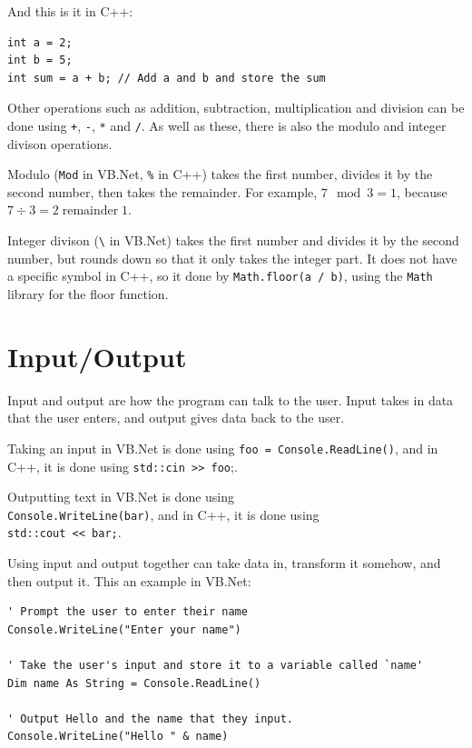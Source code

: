     And this is it in C++:
    
    \begin{verbatim}
int a = 2;
int b = 5;
int sum = a + b; // Add a and b and store the sum
    \end{verbatim}

    Other operations such as addition, subtraction, multiplication and division can be done using \verb|+|, \verb|-|, \verb|*| and \verb|/|.
    As well as these, there is also the modulo and integer divison operations.

    Modulo (\verb|Mod| in VB.Net, \verb|%| in C++) takes the first number, divides it by the second number, then takes the remainder.
    For example, $7\mod 3=1$, because $7\div3=2\;\text{remainder}\;1$.

    Integer divison (\verb|\| in VB.Net) takes the first number and divides it by the second number, but rounds down so that it only takes the integer part.
    It does not have a specific symbol in C++, so it done by \verb|Math.floor(a / b)|, using the \verb|Math| library for the floor function.

    \newpage

\section{Input/Output} \label{input_output}
    Input and output are how the program can talk to the user.
    Input takes in data that the user enters, and output gives data back to the user.

    Taking an input in VB.Net is done using \verb|foo = Console.ReadLine()|, and in C++, it is done using \verb|std::cin >> foo|;.

    Outputting text in VB.Net is done using \\ \verb|Console.WriteLine(bar)|, and in C++, it is done using \\ \verb|std::cout << bar;|.

    Using input and output together can take data in, transform it somehow, and then output it.
    This an example in VB.Net:
    
    \begin{verbatim}
' Prompt the user to enter their name
Console.WriteLine("Enter your name")

' Take the user's input and store it to a variable called `name'
Dim name As String = Console.ReadLine()

' Output Hello and the name that they input.
Console.WriteLine("Hello " & name)
    \end{verbatim}

